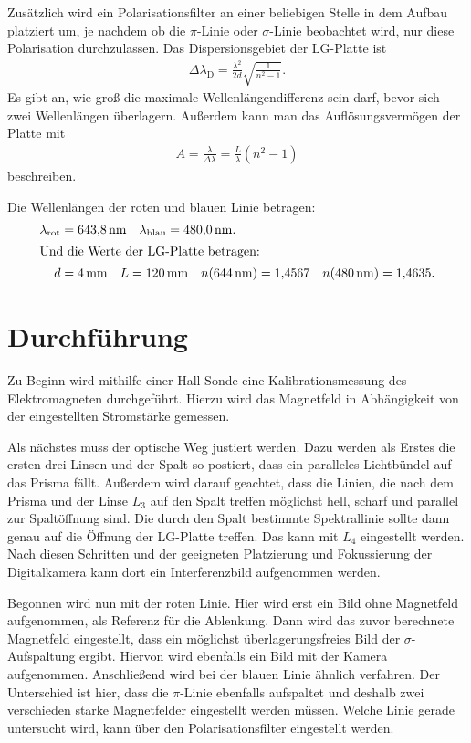 Zusätzlich wird ein Polarisationsfilter an einer beliebigen Stelle in dem Aufbau platziert um, je nachdem ob die $\pi$-Linie oder $\sigma$-Linie beobachtet wird, nur diese Polarisation durchzulassen.
Das Dispersionsgebiet
der LG-Platte ist
\begin{align}
  \Delta \lambda_\text{D} = \frac{\lambda^2}{2 d} \sqrt{\frac{1}{n^2-1}}.
\end{align}
Es gibt an, wie groß die maximale Wellenlängendifferenz sein darf, bevor sich zwei Wellenlängen überlagern. Außerdem kann man das Auflösungsvermögen der Platte mit
\begin{align}
  A = \frac{\lambda}{\Delta \lambda} = \frac{L}{\lambda} (n^2 - 1)
\end{align}
beschreiben.

Die Wellenlängen der roten und blauen Linie betragen:
\begin{align*}
  \lambda_\text{rot} &= \SI{643.8}{\nano\meter} \quad \lambda_\text{blau} = \SI{480.0}{\nano\meter}.\\
\intertext{Und die Werte der LG-Platte betragen:}
  d &= \SI{4}{\milli\meter} \quad L = \SI{120}{\milli\meter} \quad n(\SI{644}{\nano\meter}) = \num{1.4567} \quad n(\SI{480}{\nano\meter}) = \num{1.4635}.
\end{align*}

\section{Durchführung}
\label{sec:Durchführung}

Zu Beginn wird mithilfe einer Hall-Sonde eine Kalibrationsmessung des Elektromagneten durchgeführt. Hierzu wird das Magnetfeld in Abhängigkeit von der eingestellten Stromstärke gemessen.

Als nächstes muss der optische Weg justiert werden.
Dazu werden als Erstes die ersten drei Linsen und der Spalt so postiert, dass ein paralleles Lichtbündel auf das Prisma fällt. Außerdem wird darauf geachtet, dass die Linien, die nach dem Prisma und der Linse $L_3$ auf den Spalt treffen möglichst hell, scharf und parallel zur Spaltöffnung sind. Die durch den Spalt bestimmte Spektrallinie sollte dann genau auf die Öffnung der LG-Platte treffen. Das kann mit $L_4$ eingestellt werden. Nach diesen Schritten und der geeigneten Platzierung und Fokussierung der Digitalkamera kann dort ein Interferenzbild aufgenommen werden.

Begonnen wird nun mit der roten Linie. Hier wird erst ein Bild ohne Magnetfeld aufgenommen, als Referenz für die Ablenkung. Dann wird das zuvor berechnete Magnetfeld eingestellt, dass ein möglichst überlagerungsfreies Bild der $\sigma$-Aufspaltung ergibt. Hiervon wird ebenfalls ein Bild mit der Kamera aufgenommen.
Anschließend wird bei der blauen Linie ähnlich verfahren. Der Unterschied ist hier, dass die $\pi$-Linie ebenfalls aufspaltet und deshalb zwei verschieden starke Magnetfelder eingestellt werden müssen. Welche Linie gerade untersucht wird, kann über den Polarisationsfilter eingestellt werden.
